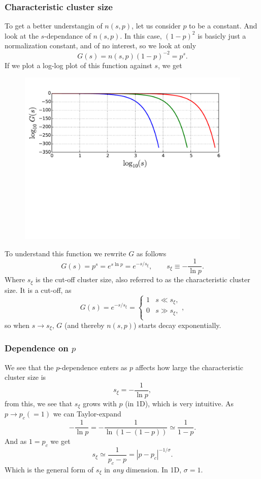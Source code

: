\documentclass[a4paper, 11pt, notitlepage, english]{article}
\begin{document}
\subsubsection*{Characteristic cluster size}
To get a better understangin of $n(s,p)$, let us consider $p$ to be a constant. And look at the $s$-dependance of $n(s,p)$. In this case, $(1-p)^2$ is basicly just a normalization constant, and of no interest, so we look at only 
$$G(s) = n(s,p)(1-p)^{-2} = p^s.$$
If we plot a log-log plot of this function against $s$, we get 
\begin{figure}[ht]
\centering
\includegraphics[width=\textwidth]{12.pdf}
\end{figure}
To understand this function we rewrite $G$ as follows
$$G(s) = p^s = e^{s \ln p} = e^{-s/s_\xi}, \qquad s_\xi \equiv -\frac{1}{\ln p}.$$
Where $s_\xi$ is the cut-off cluster size, also referred to as the characteristic cluster size. It is a cut-off, as 
$$G(s) = e^{-s/s_\xi} = \begin{cases}
1 & s \ll s_\xi, \\
0 & s \gg s_\xi, \\
\end{cases},$$
so when $s\to s_\xi$, $G$ (and thereby $n(s,p)$) starts decay exponentially.

\subsubsection*{Dependence on $p$}
We see that the $p$-dependence enters as $p$ affects how large the characteristic cluster size is
$$s_\xi = -\frac{1}{\ln p},$$
from this, we see that $s_\xi$ grows with $p$ (in 1D), which is very intuitive. As $p\to p_c (= 1)$ we can Taylor-expand
$$-\frac{1}{\ln p} = -\frac{1}{\ln(1 - (1 - p))} \simeq \frac{1}{1-p}.$$
And as $1 = p_c$ we get
$$s_\xi \simeq \frac{1}{p_c-p} = |p-p_c|^{-1/\sigma}.$$
Which is the general form of $s_\xi$ in \emph{any} dimension. In 1D, $\sigma = 1$.
\end{document}
